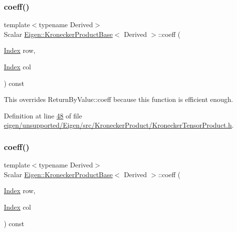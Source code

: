 \subsubsection{\texorpdfstring{coeff()}{coeff()}\hspace{0.1cm}{\footnotesize\ttfamily [1/4]}}
{\footnotesize\ttfamily template$<$typename Derived$>$ \\
Scalar \hyperlink{class_eigen_1_1_kronecker_product_base}{Eigen\+::\+Kronecker\+Product\+Base}$<$ Derived $>$\+::coeff (\begin{DoxyParamCaption}\item[{\hyperlink{namespace_eigen_a62e77e0933482dafde8fe197d9a2cfde}{Index}}]{row,  }\item[{\hyperlink{namespace_eigen_a62e77e0933482dafde8fe197d9a2cfde}{Index}}]{col }\end{DoxyParamCaption}) const\hspace{0.3cm}{\ttfamily [inline]}}

This overrides Return\+By\+Value\+::coeff because this function is efficient enough. 

Definition at line \hyperlink{eigen_2unsupported_2_eigen_2src_2_kronecker_product_2_kronecker_tensor_product_8h_source_l00048}{48} of file \hyperlink{eigen_2unsupported_2_eigen_2src_2_kronecker_product_2_kronecker_tensor_product_8h_source}{eigen/unsupported/\+Eigen/src/\+Kronecker\+Product/\+Kronecker\+Tensor\+Product.\+h}.

\mbox{\label{class_eigen_1_1_kronecker_product_base_a0b302d4e55f5a58955e6c645d066928f}} 
\subsubsection{\texorpdfstring{coeff()}{coeff()}\hspace{0.1cm}{\footnotesize\ttfamily [2/4]}}
{\footnotesize\ttfamily template$<$typename Derived$>$ \\
Scalar \hyperlink{class_eigen_1_1_kronecker_product_base}{Eigen\+::\+Kronecker\+Product\+Base}$<$ Derived $>$\+::coeff (\begin{DoxyParamCaption}\item[{\hyperlink{namespace_eigen_a62e77e0933482dafde8fe197d9a2cfde}{Index}}]{row,  }\item[{\hyperlink{namespace_eigen_a62e77e0933482dafde8fe197d9a2cfde}{Index}}]{col }\end{DoxyParamCaption}) const\hspace{0.3cm}{\ttfamily [inline]}}

